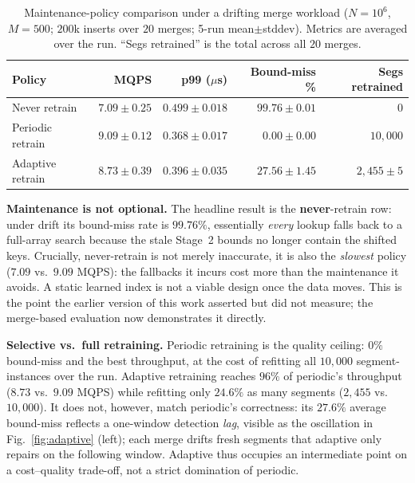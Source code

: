 \documentclass[sigconf,nonacm]{acmart}
\begin{document}
\begin{table}[t]
\centering
\caption{Maintenance-policy comparison under a drifting merge workload ($N{=}10^6$, $M{=}500$; $200$k inserts over $20$ merges; 5-run mean$\pm$stddev). Metrics are averaged over the run. ``Segs retrained'' is the total across all $20$ merges.}
\label{tab:adaptive}
\begin{tabular}{lrrrr}
\toprule
\textbf{Policy} & \textbf{MQPS} & \textbf{p99 ($\mu$s)} & \textbf{Bound-miss \%} & \textbf{Segs retrained} \\
\midrule
Never retrain    & $7.09 \pm 0.25$ & $0.499 \pm 0.018$ & $99.76 \pm 0.01$ & $0$ \\
Periodic retrain & $\mathbf{9.09 \pm 0.12}$ & $\mathbf{0.368 \pm 0.017}$ & $\mathbf{0.00 \pm 0.00}$ & $10{,}000$ \\
Adaptive retrain & $8.73 \pm 0.39$ & $0.396 \pm 0.035$ & $27.56 \pm 1.45$ & $2{,}455 \pm 5$ \\
\bottomrule
\end{tabular}
\end{table}

\noindent\textbf{Maintenance is not optional.} The headline result is the \textbf{never}-retrain row: under drift its bound-miss rate is $99.76\%$, essentially \textit{every} lookup falls back to a full-array search because the stale Stage~2 bounds no longer contain the shifted keys. Crucially, never-retrain is not merely inaccurate, it is also the \textit{slowest} policy ($7.09$ vs.\ $9.09$ MQPS): the fallbacks it incurs cost more than the maintenance it avoids. A static learned index is not a viable design once the data moves. This is the point the earlier version of this work asserted but did not measure; the merge-based evaluation now demonstrates it directly.

\noindent\textbf{Selective vs.\ full retraining.} Periodic retraining is the quality ceiling: $0\%$ bound-miss and the best throughput, at the cost of refitting all $10{,}000$ segment-instances over the run. Adaptive retraining reaches $96\%$ of periodic's throughput ($8.73$ vs.\ $9.09$ MQPS) while refitting only $24.6\%$ as many segments ($2{,}455$ vs.\ $10{,}000$). It does not, however, match periodic's correctness: its $27.6\%$ average bound-miss reflects a one-window detection \textit{lag}, visible as the oscillation in Fig.~\ref{fig:adaptive} (left); each merge drifts fresh segments that adaptive only repairs on the following window. Adaptive thus occupies an intermediate point on a cost--quality trade-off, not a strict domination of periodic.
\end{document}
